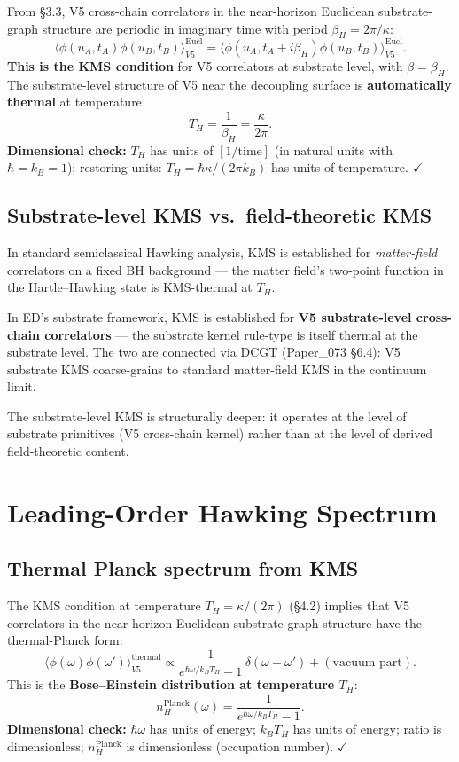 \documentclass[11pt,a4paper]{article}
\begin{document}
From \S3.3, V5 cross-chain correlators in the near-horizon Euclidean substrate-graph structure are periodic in imaginary time with period $\beta_H = 2\pi/\kappa$:
\[
\langle\phi(u_A, t_A)\phi(u_B, t_B)\rangle_{V5}^\mathrm{Eucl} = \langle\phi(u_A, t_A + i\beta_H)\phi(u_B, t_B)\rangle_{V5}^\mathrm{Eucl}.
\]
\textbf{This is the KMS condition} for V5 correlators at substrate level, with $\beta = \beta_H$. The substrate-level structure of V5 near the decoupling surface is \textbf{automatically thermal} at temperature
\[
T_H = \frac{1}{\beta_H} = \frac{\kappa}{2\pi}.
\]
\textbf{Dimensional check:} $T_H$ has units of $[1/\mathrm{time}]$ (in natural units with $\hbar = k_B = 1$); restoring units: $T_H = \hbar\kappa/(2\pi k_B)$ has units of temperature. $\checkmark$

\subsection{Substrate-level KMS vs.\ field-theoretic KMS}

In standard semiclassical Hawking analysis, KMS is established for \emph{matter-field} correlators on a fixed BH background --- the matter field's two-point function in the Hartle--Hawking state is KMS-thermal at $T_H$.

In ED's substrate framework, KMS is established for \textbf{V5 substrate-level cross-chain correlators} --- the substrate kernel rule-type is itself thermal at the substrate level. The two are connected via DCGT (Paper\_073 \S6.4): V5 substrate KMS coarse-grains to standard matter-field KMS in the continuum limit.

The substrate-level KMS is structurally deeper: it operates at the level of substrate primitives (V5 cross-chain kernel) rather than at the level of derived field-theoretic content.

\section{Leading-Order Hawking Spectrum}

\subsection{Thermal Planck spectrum from KMS}

The KMS condition at temperature $T_H = \kappa/(2\pi)$ (\S4.2) implies that V5 correlators in the near-horizon Euclidean substrate-graph structure have the thermal-Planck form:
\[
\langle\phi(\omega)\phi(\omega')\rangle_{V5}^\mathrm{thermal} \propto \frac{1}{e^{\hbar\omega/k_B T_H} - 1}\,\delta(\omega - \omega') + (\text{vacuum part}).
\]
This is the \textbf{Bose--Einstein distribution at temperature $T_H$}:
\[
n_H^\mathrm{Planck}(\omega) = \frac{1}{e^{\hbar\omega/k_B T_H} - 1}.
\]
\textbf{Dimensional check:} $\hbar\omega$ has units of energy; $k_B T_H$ has units of energy; ratio is dimensionless; $n_H^\mathrm{Planck}$ is dimensionless (occupation number). $\checkmark$
\end{document}
